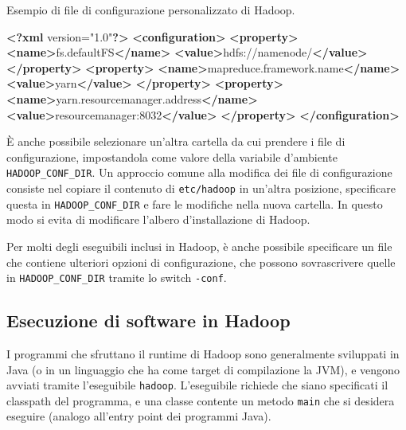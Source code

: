 \documentclass[italian,a4paper, twoside, 12pt]{report}
\newenvironment{Shaded}{}{}
\newcommand{\KeywordTok}[1]{\textcolor[rgb]{0.00,0.44,0.13}{\textbf{#1}}}
\newcommand{\NormalTok}[1]{#1}
\begin{document}
\begin{codelisting}

\caption{Esempio di file di configurazione personalizzato di Hadoop.}

\hypertarget{lst:hadoop-conf-example}{\label{lst:hadoop-conf-example}}
\begin{Shaded}
\begin{Highlighting}[]
\KeywordTok{<?xml}\NormalTok{ version="1.0"}\KeywordTok{?>}
\KeywordTok{<configuration>}
    \KeywordTok{<property>}
        \KeywordTok{<name>}\NormalTok{fs.defaultFS}\KeywordTok{</name>}
        \KeywordTok{<value>}\NormalTok{hdfs://namenode/}\KeywordTok{</value>}
    \KeywordTok{</property>}
    \KeywordTok{<property>}
        \KeywordTok{<name>}\NormalTok{mapreduce.framework.name}\KeywordTok{</name>}
        \KeywordTok{<value>}\NormalTok{yarn}\KeywordTok{</value>}
    \KeywordTok{</property>}
    \KeywordTok{<property>}
        \KeywordTok{<name>}\NormalTok{yarn.resourcemanager.address}\KeywordTok{</name>}
        \KeywordTok{<value>}\NormalTok{resourcemanager:8032}\KeywordTok{</value>}
    \KeywordTok{</property>}
\KeywordTok{</configuration>}
\end{Highlighting}
\end{Shaded}

\end{codelisting}

È anche possibile selezionare un'altra cartella da cui prendere i file
di configurazione, impostandola come valore della variabile d'ambiente
\texttt{HADOOP\_CONF\_DIR}. Un approccio comune alla modifica dei file
di configurazione consiste nel copiare il contenuto di
\texttt{etc/hadoop} in un'altra posizione, specificare questa in
\texttt{HADOOP\_CONF\_DIR} e fare le modifiche nella nuova cartella. In
questo modo si evita di modificare l'albero d'installazione di Hadoop.

Per molti degli eseguibili inclusi in Hadoop, è anche possibile
specificare un file che contiene ulteriori opzioni di configurazione,
che possono sovrascrivere quelle in \texttt{HADOOP\_CONF\_DIR} tramite
lo switch \texttt{-conf}.

\hypertarget{esecuzione-di-software-in-hadoop}{\subsection{Esecuzione di
software in Hadoop}\label{esecuzione-di-software-in-hadoop}}

I programmi che sfruttano il runtime di Hadoop sono generalmente
sviluppati in Java (o in un linguaggio che ha come target di
compilazione la JVM), e vengono avviati tramite l'eseguibile
\texttt{hadoop}. L'eseguibile richiede che siano specificati il
classpath del programma, e una classe contente un metodo \texttt{main}
che si desidera eseguire (analogo all'entry point dei programmi Java).
\end{document}
